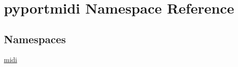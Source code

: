 \hypertarget{namespacepyportmidi}{}\section{pyportmidi Namespace Reference}
\label{namespacepyportmidi}
\subsection*{Namespaces}
\begin{DoxyCompactItemize}
\item 
 \hyperlink{namespacepyportmidi_1_1midi}{midi}
\end{DoxyCompactItemize}
